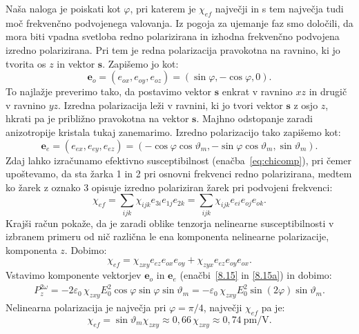 Naša naloga je poiskati kot $\varphi$, pri katerem je 
$\chi_{ef}$ največji in s tem največja tudi moč frekvenčno podvojenega valovanja.
Iz pogoja za ujemanje faz smo določili, da mora biti vpadna svetloba redno polarizirana in 
izhodna frekvenčno podvojena izredno polarizirana. Pri tem je redna polarizacija pravokotna na 
ravnino, ki jo tvorita os $z$ in vektor $\mathbf{s}$. Zapišemo jo kot:
\begin{equation}
\mathbf{e}_o=(e_{ox}, e_{oy}, e_{oz}) = (\sin\varphi,-\cos\varphi,0).
\label{8.15}
\end{equation}
To najlažje preverimo tako, da postavimo vektor $\mathbf{s}$ enkrat v ravnino $xz$ in
drugič v ravnino $yz$. Izredna polarizacija leži v ravnini, ki jo tvori 
vektor $\mathbf{s}$ z osjo $z$, hkrati pa je približno pravokotna na vektor $\mathbf{s}$. 
Majhno odstopanje zaradi anizotropije kristala tukaj zanemarimo. Izredno polarizacijo 
tako zapišemo kot: 
\begin{equation}
\mathbf{e}_e=(e_{ex}, e_{ey}, e_{ez}) 
=(-\cos \varphi \cos \vartheta_m,-\sin \varphi \cos \vartheta_m ,\sin \vartheta_m).
\label{8.15a}
\end{equation}
Zdaj lahko izračunamo efektivno susceptibilnost (enačba~\ref{eq:chicomp}), 
pri čemer upoštevamo, da sta žarka 1 in 2 pri osnovni frekvenci redno polarizirana, medtem ko
žarek z oznako 3 opisuje izredno polariziran žarek pri podvojeni frekvenci:
\begin{equation}
\chi_{ef} = \sum_{ijk} \chi_{ijk} e_{3i} e_{1j} e_{2k} = \sum_{ijk} \chi_{ijk} e_{ei} e_{oj} e_{ok}.
\end{equation}
Krajši račun pokaže, da je zaradi oblike tenzorja nelinearne susceptibilnosti v izbranem 
primeru od nič različna le ena komponenta nelinearne polarizacije, komponenta $z$. Dobimo:
\begin{equation}
\chi_{ef} = \chi_{zxy} e_{ez} e_{ox} e_{oy} + \chi_{zyx} e_{ez} e_{oy} e_{ox}.
\end{equation}
Vstavimo komponente vektorjev $\mathbf{e}_o$ in $\mathbf{e}_e$ (enačbi~\ref{8.15} in \ref{8.15a}) in dobimo:
\begin{align}
P_{z}^{2\omega}=- 2\varepsilon_0\, \chi_{zxy}E_{0}^2\cos\varphi\sin\varphi
\sin\vartheta_m = - \varepsilon_0\, \chi_{zxy}E_{0}^2\sin(2\varphi) \sin\vartheta_m.
\label{8.151}
\end{align}
Nelinearna polarizacija je največja pri $\varphi=\pi/4$, največji $\chi_{ef}$  pa je:
\begin{equation}
\chi_{ef}= 
\sin\vartheta_m \chi_{zxy} \approx 0,66\, \chi_{zxy} \approx 
0,74~\si{\pico\metre/\volt}.
\label{8.16}
\end{equation}

